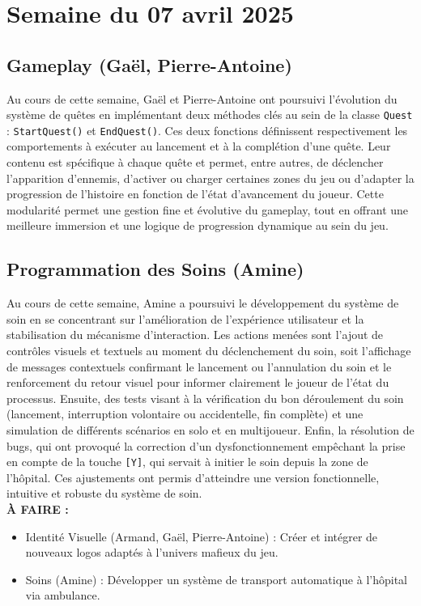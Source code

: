 \documentclass{report}
\begin{document}
\newpage
\section{Semaine du 07 avril 2025}

\subsection*{Gameplay (Gaël, Pierre-Antoine)}
Au cours de cette semaine, Gaël et Pierre-Antoine ont poursuivi l’évolution du système de quêtes en implémentant deux méthodes clés au sein de la classe \texttt{Quest} : \texttt{StartQuest()} et \texttt{EndQuest()}. Ces deux fonctions définissent respectivement les comportements à exécuter au lancement et à la complétion d’une quête. Leur contenu est spécifique à chaque quête et permet, entre autres, de déclencher l’apparition d’ennemis, d’activer ou charger certaines zones du jeu ou d’adapter la progression de l’histoire en fonction de l’état d’avancement du joueur. Cette modularité permet une gestion fine et évolutive du gameplay, tout en offrant une meilleure immersion et une logique de progression dynamique au sein du jeu.


\subsection*{Programmation des Soins (Amine)}
Au cours de cette semaine, Amine a poursuivi le développement du système de soin en se concentrant sur l'amélioration de l’expérience utilisateur et la stabilisation du mécanisme d’interaction. Les actions menées sont l’ajout de contrôles visuels et textuels au moment du déclenchement du soin, soit l’affichage de messages contextuels confirmant le lancement ou l’annulation du soin et le renforcement du retour visuel pour informer clairement le joueur de l’état du processus. Ensuite, des tests visant à la vérification du bon déroulement du soin (lancement, interruption volontaire ou accidentelle, fin complète) et une simulation de différents scénarios en solo et en multijoueur. Enfin, la résolution de bugs, qui ont provoqué la correction d’un dysfonctionnement empêchant la prise en compte de la touche \texttt{[Y]}, qui servait à initier le soin depuis la zone de l’hôpital. Ces ajustements ont permis d’atteindre une version fonctionnelle, intuitive et robuste du système de soin.
\\[1cm]
\textbf{À FAIRE :}
\begin{itemize}
    \item Identité Visuelle (Armand, Gaël, Pierre-Antoine) : Créer et intégrer de nouveaux logos adaptés à l’univers mafieux du jeu.
    \item Soins (Amine) : Développer un système de transport automatique à l’hôpital via ambulance.
\end{itemize}
\end{document}
